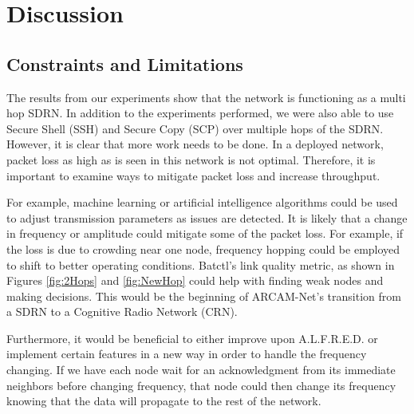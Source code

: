 
\chapter{Discussion} %

\label{Chapter5} %




\section{Constraints and Limitations}



The results from our experiments show that the network is functioning as a multi hop SDRN. In addition to the experiments performed, we were also able to use Secure Shell (SSH) and Secure Copy (SCP) over multiple hops of the SDRN. However, it is clear that more work needs to be done. In a deployed network, packet loss as high as is seen in this network is not optimal. Therefore, it is important to examine ways to mitigate packet loss and increase throughput. 

For example, machine learning or artificial intelligence algorithms could be used to adjust transmission parameters as issues are detected. It is likely that a change in frequency or amplitude could mitigate some of the packet loss. For example, if the loss is due to crowding near one node, frequency hopping could be employed to shift to better operating conditions. Batctl's link quality metric, as shown in Figures \ref{fig:2Hops} and \ref{fig:NewHop} could help with finding weak nodes and making decisions. This would be the beginning of ARCAM-Net's transition from a SDRN to a Cognitive Radio Network (CRN). 

Furthermore, it would be beneficial to either improve upon A.L.F.R.E.D. or implement certain features in a new way in order to handle the frequency changing. If we have each node wait for an acknowledgment from its immediate neighbors before changing frequency, that node could then change its frequency knowing that the data will propagate to the rest of the network. 

